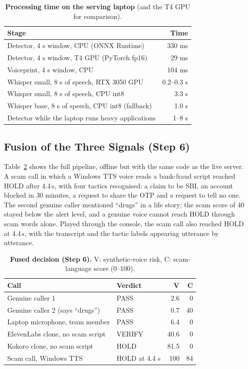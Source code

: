 \documentclass[10pt,a4paper,twocolumn]{article}
\begin{document}
\begin{table}[t]
\centering\footnotesize
\caption{\textbf{Processing time on the serving laptop} (and the T4 GPU for comparison).}
\label{tab:latency}
\begin{tabular}{@{}p{}r@{}}
\toprule
\textbf{Stage} & \textbf{Time}\\
\midrule
Detector, 4 s window, CPU (ONNX Runtime) & 330 ms\\
Detector, 4 s window, T4 GPU (PyTorch fp16) & 29 ms\\
Voiceprint, 4 s window, CPU & 104 ms\\
Whisper small, 8 s of speech, RTX 3050 GPU & 0.2--0.3 s\\
Whisper small, 8 s of speech, CPU int8 & 3.3 s\\
Whisper base, 8 s of speech, CPU int8 (fallback) & 1.0 s\\
Detector while the laptop runs heavy applications & 1--8 s\\
\bottomrule
\end{tabular}
\end{table}

\subsection{Fusion of the Three Signals (Step 6)}
Table~\ref{tab:fusion} shows the full pipeline, offline but with the same code as the live server. A scam call in which a Windows TTS voice reads a bank-fraud script reached HOLD after 4.4\,s, with four tactics recognised: a claim to be SBI, an account blocked in 30 minutes, a request to share the OTP and a request to tell no one. The second genuine caller mentioned ``drugs'' in a life story; the scam score of 40 stayed below the alert level, and a genuine voice cannot reach HOLD through scam words alone. Played through the console, the scam call also reached HOLD at 4.4\,s, with the transcript and the tactic labels appearing utterance by utterance.

\begin{table}[t]
\centering\footnotesize
\caption{\textbf{Fused decision (Step 6).} V: synthetic-voice risk, C: scam-language score (0--100).}
\label{tab:fusion}
\begin{tabular}{@{}p{}lrr@{}}
\toprule
\textbf{Call} & \textbf{Verdict} & \textbf{V} & \textbf{C}\\
\midrule
Genuine caller 1 & PASS & 2.6 & 0\\
Genuine caller 2 (says ``drugs'') & PASS & 0.7 & 40\\
Laptop microphone, team member & PASS & 6.4 & 0\\
ElevenLabs clone, no scam script & VERIFY & 40.6 & 0\\
Kokoro clone, no scam script & HOLD & 81.5 & 0\\
Scam call, Windows TTS & HOLD at 4.4 s & 100 & 84\\
\bottomrule
\end{tabular}
\end{table}
\end{document}

